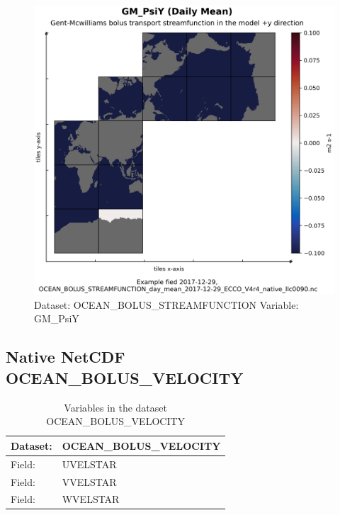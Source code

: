 \begin{figure}[H]
\centering
\includegraphics[width=\textwidth]{../images/plots/native_plots/Gent-McWilliams_Bolus_Transport_Streamfunction/GM_PsiY.png}
\caption{Dataset: OCEAN\_BOLUS\_STREAMFUNCTION Variable: GM\_PsiY}
\label{tab:table-OCEAN_BOLUS_STREAMFUNCTION_GM_PsiY-Plot}
\end{figure}
\pagebreak
\subsection{Native NetCDF OCEAN\_BOLUS\_VELOCITY}
\newp
\begin{longtable}{|p{}|p{}|}
\caption{Variables in the dataset OCEAN\_BOLUS\_VELOCITY}
\label{tab:table-OCEAN_BOLUS_VELOCITY-fields} \\ 
\hline \endhead \hline \endfoot
\rowcolor{lightgray} \textbf{Dataset:} & \textbf{OCEAN\_BOLUS\_VELOCITY} \\ \hline
Field: &UVELSTAR \\ \hline
Field: &VVELSTAR \\ \hline
Field: &WVELSTAR \\ \hline
\end{longtable}

\pagebreak
